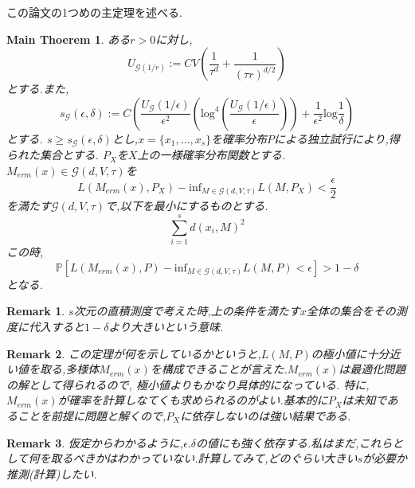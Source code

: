 \documentclass{jarticle}
\newtheorem*{rem}{Remark}
\newtheorem{mtm}{Main Thoerem}
\begin{document}
この論文の1つめの主定理を述べる.
\begin{mtm}
\label{mth1}
 ある$r > 0$に対し,
 \begin{equation*}
  U_{\mathcal{G}(1/r)}:=CV( \frac{ 1 }{ \tau^d } + \frac{ 1 }{ (\tau r)^{d/2} } )
 \end{equation*}
 とする.また,
 \begin{equation*}
  s_{\mathcal{G}}(\epsilon,\delta):=C(\frac{ U_{\mathcal{G}}(1/\epsilon) }{ \epsilon^2 }(\mathrm{log}^4
  (\frac{U_{\mathcal{G}}(1/\epsilon)}{\epsilon})) + \frac{ 1 }{ \epsilon^2 }\mathrm{log}\frac{ 1 }{ \delta }  )
 \end{equation*}
とする.
$s \ge s_{\mathcal{G}}(\epsilon,\delta)$とし,$x=\{ x_1,\dots,x_s\}$を確率分布$P$による独立試行により,得られた集合とする.
$P_X$を$X$上の一様確率分布関数とする.
$M_{erm}(x) \in \mathcal{G}(d,V,\tau)$を
\begin{equation*}
 L(M_{erm}(x),P_X) - \mathrm{inf}_{M \in \mathcal{G}(d,V,\tau)} L(M,P_X) < \frac{ \epsilon }{ 2 }
\end{equation*}
を満たす$\mathcal{G}(d,V,\tau)$で,以下を最小にするものとする.
\begin{equation*}
 \sum_{i=1}^sd(x_i,M)^2
\end{equation*}
この時,
\begin{equation*}
 \mathbb{P}[L(M_{erm}(x),P) - \mathrm{inf}_{M \in \mathcal{G}(d,V,\tau)} L(M,P) < \epsilon] > 1- \delta
\end{equation*}
となる.
\end{mtm}
\begin{rem}
 $s$次元の直積測度で考えた時,上の条件を満たす$x$全体の集合をその測度に代入すると$1- \delta$より大きいという意味.
\end{rem}
\begin{rem}
 この定理が何を示しているかというと,$L(M,P)$の極小値に十分近い値を取る,多様体$M_{erm}(x)$を構成できることが言えた.$M_{erm}(x)$は最適化問題の解として得られるので,
 極小値よりもかなり具体的になっている.
 特に,$M_{erm}(x)$が確率を計算しなてくも求められるのがよい.基本的に$P_X$は未知であることを前提に問題と解くので,$P_X$に依存しないのは強い結果である.
\end{rem}
\begin{rem}
  仮定からわかるように,$\epsilon.\delta$の値にも強く依存する.私はまだ,これらとして何を取るべきかはわかっていない.計算してみて,どのぐらい大きい$s$が必要か推測(計算)したい.
\end{rem}
\end{document}

